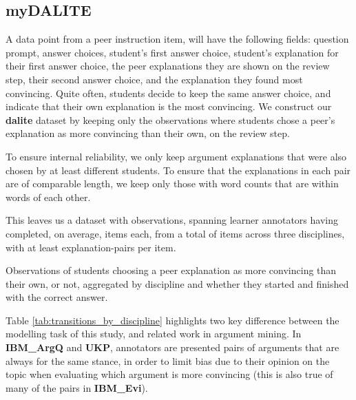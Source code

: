 \documentclass[runningheads]{llncs}
\begin{document}
\subsection{myDALITE}
A data point from a peer instruction item, will have the following fields: 
question prompt, answer choices, student's first answer choice, student's 
explanation for their first answer choice, the peer explanations they are shown 
on the review step, their second answer choice, and the explanation they found 
most convincing.
Quite often, students decide to keep the same answer choice, and indicate that 
their own explanation is the most convincing.
We construct our \textbf{dalite} dataset by keeping only the observations where 
students chose a peer's explanation as more convincing than their own, on the 
review step.   

To ensure internal reliability, we only keep argument explanations that were 
also chosen by at least different 
students. 
To ensure that the explanations in each pair are of comparable length, we keep 
only those with word counts that are within 
words of each other. 

This leaves us a dataset with observations, 
spanning  learner annotators having 
completed, on average, 
 items each, from a total of 
 items across three disciplines, 
with at least 
explanation-pairs 
per item.


\begin{table}
	\caption{Observations of students choosing a peer explanation as 
		more 
		convincing than their own, or not, aggregated by discipline and whether 
		they 
		started and finished with the correct answer.}
	
	\centerline{}
	
	\label{tab:transitions_by_discipline}
\end{table}

Table \ref{tab:transitions_by_discipline} highlights two key difference between 
the modelling task of this study, and related work in argument mining. 
In \textbf{IBM\_ArgQ} and \textbf{UKP}, annotators are presented pairs of 
arguments that are always for the same stance, in order to limit bias due to 
their opinion on the topic when evaluating which argument is more convincing 
(this is also true of many of the pairs in \textbf{IBM\_Evi}).
\end{document}
